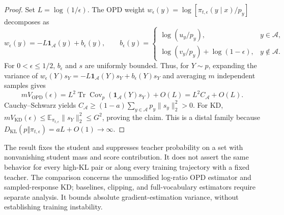 \begin{proof}
Set $L=\log(1/\epsilon)$. The OPD weight
$w_\epsilon(y)=\log[\pi_{t,\epsilon}(y\mid x)/p_y]$ decomposes as
\begin{equation}
 w_\epsilon(y)=-L\mathbf1_{\mathcal A}(y)+b_\epsilon(y),
 \qquad
 b_\epsilon(y)=
 \begin{cases}
   \log(u_y/p_y),&y\in\mathcal A,\\
   \log(v_y/p_y)+\log(1-\epsilon),&y\notin\mathcal A.
 \end{cases}
 \label{eq:distal-weight-decomposition}
\end{equation}
For $0<\epsilon\le1/2$, $b_\epsilon$ and $s$ are uniformly bounded.
Thus, for $Y\sim p$, expanding the variance of
$w_\epsilon(Y)s_Y=-L\mathbf1_{\mathcal A}(Y)s_Y+b_\epsilon(Y)s_Y$
and averaging $m$ independent samples gives
\begin{equation}
 mV_{\mathrm{OPD}}(\epsilon)
 =L^2\operatorname{Tr}\operatorname{Cov}_p
       (\mathbf1_{\mathcal A}(Y)s_Y)+O(L)
 =L^2 C_{\mathcal A}+O(L).
 \label{eq:distal-variance-expansion}
\end{equation}
Cauchy--Schwarz yields
$C_{\mathcal A}\ge(1-a)\sum_{y\in\mathcal A}p_y\|s_y\|_2^2>0$.
For KD,
$mV_{\mathrm{KD}}(\epsilon)
\le\mathbb E_{\pi_{t,\epsilon}}\|s_Y\|_2^2\le G^2$,
proving the claim. This is a distal family because
$D_{\mathrm{KL}}(p\Vert\pi_{t,\epsilon})=aL+O(1)\to\infty$.
\end{proof}

The result fixes the student and suppresses teacher probability on a set
with nonvanishing student mass and score contribution. It does not assert
the same behavior for every high-KL pair or along every training trajectory
with a fixed teacher. The comparison concerns the unmodified log-ratio OPD
estimator and sampled-response KD; baselines, clipping, and full-vocabulary
estimators require separate analysis. It bounds absolute gradient-estimation
variance, without establishing training instability.
